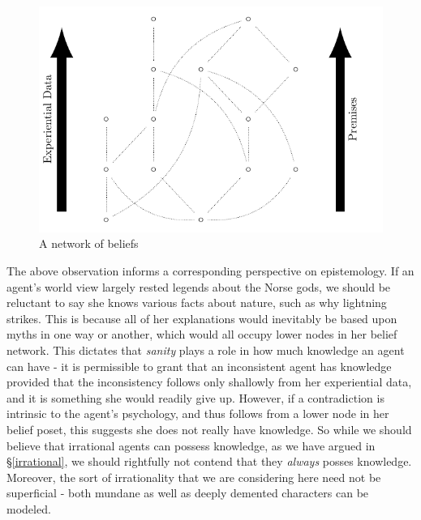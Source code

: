 \documentclass[11pt]{article}
\numberwithin{equation}{subsection}
\begin{document}
\begin{figure}[ht]
\begin{center}
\includegraphics[]{poset/poset2.pdf}
\end{center}
\caption{A network of beliefs}
\label{fig:poset}
\end{figure}

The above observation informs a corresponding perspective on
epistemology.  If an agent's world view largely rested legends about
the Norse gods, we should be reluctant to say she knows various facts about
nature, such as why lightning strikes.  This is because all of her
explanations would inevitably be based upon myths in one way or
another, which would all occupy lower nodes in her belief network.
This dictates that \emph{sanity} plays a role in how much knowledge an
agent can have - it is permissible to grant that an inconsistent agent
has knowledge provided that the inconsistency follows only shallowly
from her experiential data, and it is something she would readily give
up.  However, if a contradiction is intrinsic to the agent's
psychology, and thus follows from a lower node in her belief poset,
this suggests she does not really have knowledge.  So while we
should believe that irrational agents can possess knowledge, as we have argued
in \S\ref{irrational}, we should rightfully not contend that they \emph{always} posses
knowledge. Moreover, the sort of irrationality that we are considering here
need not be superficial - both mundane as well as deeply demented characters can be modeled.
\end{document}
